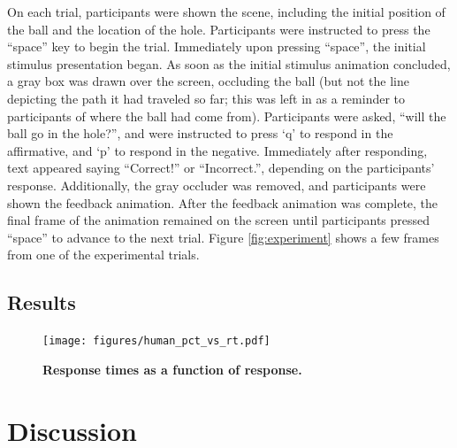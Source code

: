 \documentclass[11pt]{article}
\begin{document}
On each trial, participants were shown the scene, including the initial position of the ball and the location of the hole. Participants were instructed to press the ``space'' key to begin the trial. Immediately upon pressing ``space'', the initial stimulus presentation began. As soon as the initial stimulus animation concluded, a gray box was drawn over the screen, occluding the ball (but not the line depicting the path it had traveled so far; this was left in as a reminder to participants of where the ball had come from). Participants were asked, ``will the ball go in the hole?'', and were instructed to press `q' to respond in the affirmative, and `p' to respond in the negative. Immediately after responding, text appeared saying ``Correct!'' or ``Incorrect.'', depending on the participants' response. Additionally, the gray occluder was removed, and participants were shown the feedback animation. After the feedback animation was complete, the final frame of the animation remained on the screen until participants pressed ``space'' to advance to the next trial. Figure \ref{fig:experiment} shows a few frames from one of the experimental trials.

\subsection{Results}

\begin{figure}[h]
    \begin{center}
        \texttt{[image: figures/human\_pct\_vs\_rt.pdf]}
        \caption{\textbf{Response times as a function of response.}}
        \label{fig:pct-vs-rt}
    \end{center}
\end{figure}



\section{Discussion}


\end{document}

